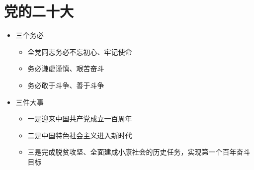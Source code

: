 \documentclass[12pt,openany]{ctexbook}
\begin{document}
\section{党的二十大}
\begin{itemize}
  \item 三个务必
\begin{itemize}
  \item 全党同志务必不忘初心、牢记使命
  \item 务必谦虚谨慎、艰苦奋斗
  \item 务必敢于斗争、善于斗争
\end{itemize}
  \item 三件大事
\begin{itemize}
  \item 一是迎来中国共产党成立一百周年
  \item 二是中国特色社会主义进入新时代
  \item 三是完成脱贫攻坚、全面建成小康社会的历史任务，实现第一个百年奋斗目标
\end{itemize}
\end{itemize}
\end{document}
